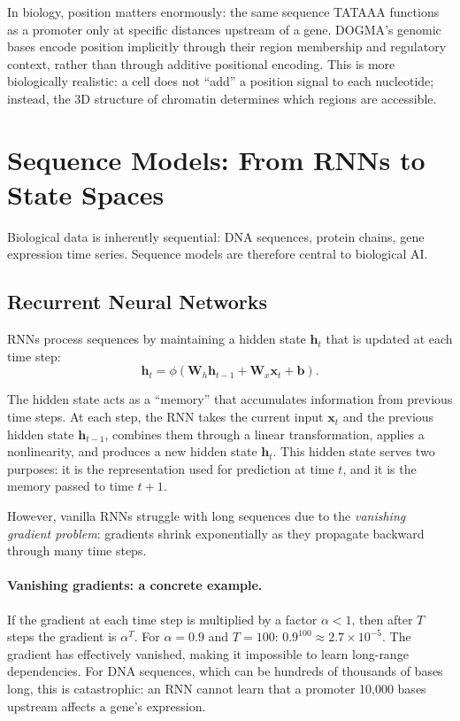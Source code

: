 \begin{bioinsight}
In biology, position matters enormously: the same sequence TATAAA functions as a promoter only at specific distances upstream of a gene. DOGMA's genomic bases encode position implicitly through their region membership and regulatory context, rather than through additive positional encoding. This is more biologically realistic: a cell does not ``add'' a position signal to each nucleotide; instead, the 3D structure of chromatin determines which regions are accessible.
\end{bioinsight}

\section{Sequence Models: From RNNs to State Spaces}
\label{sec:sequence-models}

Biological data is inherently sequential: DNA sequences, protein chains, gene expression time series. Sequence models are therefore central to biological AI.

\subsection{Recurrent Neural Networks}

RNNs process sequences by maintaining a hidden state $\mathbf{h}_t$ that is updated at each time step:
\begin{equation}
\mathbf{h}_t = \phi(\mathbf{W}_h \mathbf{h}_{t-1} + \mathbf{W}_x \mathbf{x}_t + \mathbf{b}).
\end{equation}

The hidden state acts as a ``memory'' that accumulates information from previous time steps. At each step, the RNN takes the current input $\mathbf{x}_t$ and the previous hidden state $\mathbf{h}_{t-1}$, combines them through a linear transformation, applies a nonlinearity, and produces a new hidden state $\mathbf{h}_t$. This hidden state serves two purposes: it is the representation used for prediction at time $t$, and it is the memory passed to time $t+1$.

However, vanilla RNNs struggle with long sequences due to the \emph{vanishing gradient problem}: gradients shrink exponentially as they propagate backward through many time steps.

\paragraph{Vanishing gradients: a concrete example.} If the gradient at each time step is multiplied by a factor $\alpha < 1$, then after $T$ steps the gradient is $\alpha^T$. For $\alpha = 0.9$ and $T = 100$: $0.9^{100} \approx 2.7 \times 10^{-5}$. The gradient has effectively vanished, making it impossible to learn long-range dependencies. For DNA sequences, which can be hundreds of thousands of bases long, this is catastrophic: an RNN cannot learn that a promoter 10,000 bases upstream affects a gene's expression.

